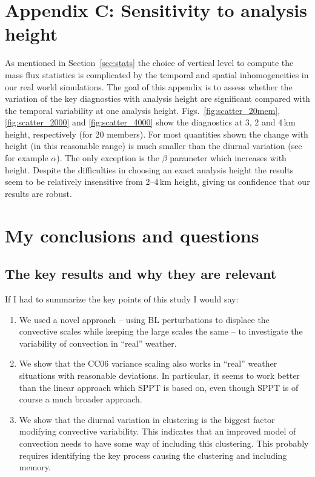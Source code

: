 \documentclass[a4paper, 12pt]{article}
\begin{document}
\section{Appendix C: Sensitivity to analysis height}
As mentioned in Section~\ref{sec:stats} the choice of vertical level to compute the mass flux statistics is complicated by the temporal and spatial inhomogeneities in our real world simulations. The goal of this appendix is to assess whether the variation of the key diagnostics with analysis height are significant compared with the temporal variability at one analysis height. Figs.~\ref{fig:scatter_20mem}, \ref{fig:scatter_2000} and \ref{fig:scatter_4000} show the diagnostics at 3, 2 and 4\,km height, respectively (for 20 members). For most quantities shown the change with height (in this reasonable range) is much smaller than the diurnal variation (see for example $\alpha$). The only exception is the $\beta$ parameter which increases with height. Despite the difficulties in choosing an exact analysis height the results seem to be relatively insensitive from 2--4\,km height, giving us confidence that our results are robust. 


\section{My conclusions and questions}
\subsection{The key results and why they are relevant}
If I had to summarize the key points of this study I would say:
\begin{enumerate}
 \item We used a novel approach -- using BL perturbations to displace the convective scales while keeping the large scales the same -- to investigate the variability of convection in ``real'' weather. 
 \item We show that the CC06 variance scaling also works in ``real'' weather situations with reasonable deviations. In particular, it seems to work better than the linear approach which SPPT is based on, even though SPPT is of course a much broader approach. 
 \item We show that the diurnal variation in clustering is the biggest factor modifying convective variability. This indicates that an improved model of convection needs to have some way of including this clustering. This probably requires identifying the key process causing the clustering and including memory. 
\end{enumerate}
\end{document}

